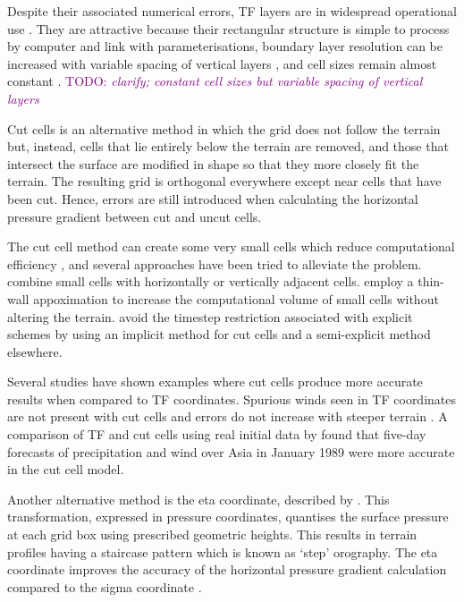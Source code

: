 \documentclass{ametsoc}
\newcommand{\TODO}[1]{\textcolor{purple}{TODO: \emph{#1}}}
\begin{document}
Despite their associated numerical errors, TF layers are in widespread operational use \citep{steppeler2003}.  They are attractive because their rectangular structure is simple to process by computer and link with parameterisations, boundary layer resolution can be increased with variable spacing of vertical layers \citep{schaer2002}, and cell sizes remain almost constant \citep{jebens2011}. \TODO{clarify; constant cell sizes but variable spacing of vertical layers}

Cut cells is an alternative method in which the grid does not follow the terrain but, instead, cells that lie entirely below the terrain are removed, and those that intersect the surface are modified in shape so that they more closely fit the terrain.  The resulting grid is orthogonal everywhere except near cells that have been cut.  Hence, errors are still introduced when calculating the horizontal pressure gradient between cut and uncut cells.

The cut cell method can create some very small cells which reduce computational efficiency \citep{klein2009}, and several approaches have been tried to alleviate the problem.  \citet{yamazaki-satomura2010} combine small cells with horizontally or vertically adjacent cells.  \citet{steppeler2002} employ a thin-wall appoximation to increase the computational volume of small cells without altering the terrain.  \citet{jebens2011} avoid the timestep restriction associated with explicit schemes by using an implicit method for cut cells and a semi-explicit method elsewhere.

Several studies have shown examples where cut cells produce more accurate results when compared to TF coordinates.  Spurious winds seen in TF coordinates are not present with cut cells and errors do not increase with steeper terrain \citep{good2014}.  A comparison of TF and cut cells using real initial data by \citet{steppeler2013} found that five-day forecasts of precipitation and wind over Asia in January 1989 were more accurate in the cut cell model.

Another alternative method is the eta coordinate, described by \citet{mesinger1988}.  This transformation, expressed in pressure coordinates, quantises the surface pressure at each grid box using prescribed geometric heights.  This results in terrain profiles having a staircase pattern which is known as `step' orography.  The eta coordinate improves the accuracy of the horizontal pressure gradient calculation compared to the sigma coordinate \citep{mesinger1988}.
\end{document}
